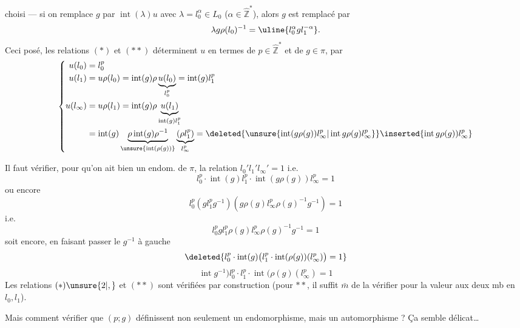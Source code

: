 choisi --- si on  remplace $g$ par $\operatorname{int}(\lambda)u$ avec $\lambda=l_0^\alpha\in L_0$ ($\alpha\in\hat{\mathbb Z}^{*}$), alors $g$ est remplacé par
\[
\lambda g\rho(l_0)^{-1}=\uline{l_0^\alpha gl_1^{-\alpha}}.
\]
Ceci posé,  les relations $(*)$ et $(**)$ déterminent $u$ en termes de $p\in\hat{\mathbb Z}^{*}$ et de $g\in\pi$, par
\[
\left\{\begin{aligned}
u(l_0)&=l_0^p\\
u(l_1)&=u\rho(l_0)=\operatorname{int}(g)\rho\underbrace{u(l_0)}_{l_0^p}=\operatorname{int}(g)l_1^p\\
u(l_\infty)&=u\rho(l_1)=\operatorname{int}(g)\rho\underbrace{u(l_1)}_{\operatorname{int}(g)l_1^p}\\
&=\operatorname{int}(g)\underbrace{\rho\operatorname{int}(g)\rho^{-1}}_{\unsure{\operatorname{int}(\rho(g))}}\underbrace{(\rho l_1^p)}_{l_\infty^p}
=\deleted{\unsure{\operatorname{int}(g\rho(g))l_\infty^p|\operatorname{int}g\rho(g)l_\infty^p}}\inserted{\operatorname{int}g\rho(g))l_\infty^p}
\end{aligned}\right.
\]

Il faut vérifier, pour qu'on ait bien un endom. de $\pi$, la relation $l_0'l_1'l_\infty'=1$ i.e.
\[
\boxed{l_0^p\cdot\operatorname{int}(g)l_1^p\cdot\operatorname{int}(g\rho(g))l_\infty^p=1}
\]
ou encore
\[
l_0^p(gl_1^pg^{-1})(g\rho(g)l_\infty^p\rho(g)^{-1}g^{-1})=1
\]
i.e.
\[
l_0^pgl_1^p\rho(g)l_\infty^p\rho(g)^{-1}g^{-1}=1
\]
soit encore, en faisant passer le $g^{-1}$ à gauche
\[
\deleted{l_0^p\cdot\operatorname{int}(g)\bigl(l_1^p\cdot\operatorname{int}(\rho(g))(l_\infty^p)\bigr)=1}
\]
\[
\operatorname{int}g^{-1})l_0^p\cdot l_1^p\cdot\operatorname{int}(\rho(g)(l_\infty^p)=1
\]
Les relations $(*)\unsure{2|,}$ et $(**)$ sont vérifiées par construction (pour $**$, il suffit $\bar m$ de la vérifier pour la valeur aux deux mb en $l_0,l_1$).

Mais comment vérifier que $(p;g)$ définissent non seulement un endomorphisme, mais un automorphisme ? Ça semble délicat\ldots

